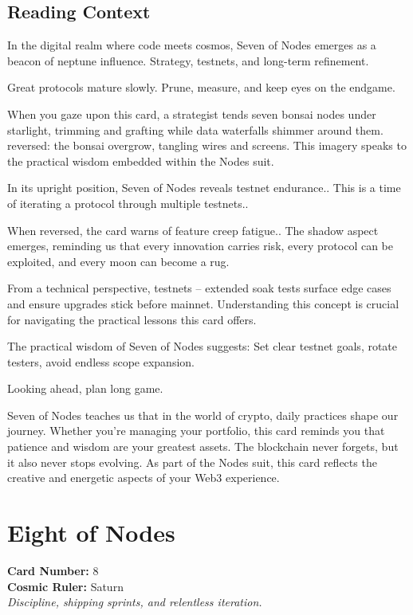 \documentclass[11pt,oneside]{book}
\begin{document}
\begin{minipage}[t]{0.55\textwidth}
  \subsection*{Reading Context}
  In the digital realm where code meets cosmos, Seven of Nodes emerges as a beacon of neptune influence. Strategy, testnets, and long-term refinement.

  Great protocols mature slowly. Prune, measure, and keep eyes on the endgame.

  When you gaze upon this card, a strategist tends seven bonsai nodes under starlight, trimming and grafting while data waterfalls shimmer around them. reversed: the bonsai overgrow, tangling wires and screens. This imagery speaks to the practical wisdom embedded within the Nodes suit.

  In its upright position, Seven of Nodes reveals testnet endurance.. This is a time of iterating a protocol through multiple testnets..

  When reversed, the card warns of feature creep fatigue.. The shadow aspect emerges, reminding us that every innovation carries risk, every protocol can be exploited, and every moon can become a rug.

  From a technical perspective, testnets – extended soak tests surface edge cases and ensure upgrades stick before mainnet. Understanding this concept is crucial for navigating the practical lessons this card offers.

  The practical wisdom of Seven of Nodes suggests: Set clear testnet goals, rotate testers, avoid endless scope expansion.

  Looking ahead, plan long game.

  Seven of Nodes teaches us that in the world of crypto, daily practices shape our journey. Whether you're managing your portfolio, this card reminds you that patience and wisdom are your greatest assets. The blockchain never forgets, but it also never stops evolving. As part of the Nodes suit, this card reflects the creative and energetic aspects of your Web3 experience.

\end{minipage}

\newpage
\section*{Eight of Nodes}

\begin{minipage}[t]{0.55\textwidth}
  \vspace{0pt}
  \textbf{Card Number:} 8\\  \textbf{Cosmic Ruler:} Saturn\\  \textit{Discipline, shipping sprints, and relentless iteration.}
\end{minipage}
\end{document}
